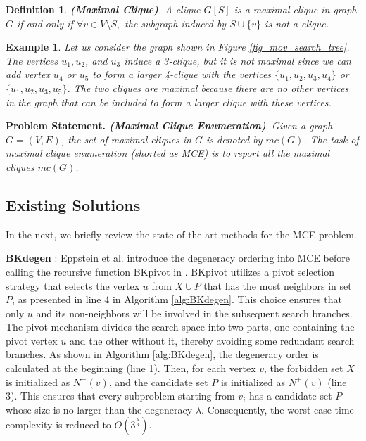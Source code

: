 \documentclass[sigconf, nonacm]{acmart}
\newtheorem{definition}{Definition}%
\newtheorem{exmp}{Example}%
\begin{document}
\begin{definition}
\textit{{\textbf{(Maximal Clique)}}.
A clique $G[S]$ is a maximal clique in graph $G$ if and only if $\forall v \in V\setminus S,$ the subgraph induced by $S\cup \{v\}$ is not a clique.
}
\end{definition}

\begin{exmp}
    \textit{
    Let us consider the graph shown in Figure \ref{fig_mov_search_tree}. The vertices $u_1, u_2$, and $u_3$ induce a 3-clique, but it is not maximal since we can add vertex $u_4$ or $u_5$ to form a larger 4-clique with the vertices $\{u_1, u_2, u_3,u_4\}$ or 
 $\{u_1, u_2, u_3,u_5\}$. The two cliques are maximal because there are no other vertices in the graph that can be included to form a larger clique with these vertices.
    }
\end{exmp}

\noindent \textbf{Problem Statement.  \textit{(Maximal Clique Enumeration)}}. \textit{Given a graph $G=(V,E)$, the set of maximal cliques in $G$ is denoted by $mc(G)$. The task of maximal clique enumeration (shorted as MCE) is to report all the maximal cliques $mc(G)$. 
}

\subsection{Existing Solutions}\label{subsec:existing solutions}

In the next, we %
briefly review the state-of-the-art methods for the MCE problem.




\noindent\textbf{BKdegen} \cite{eppstein2010listing}: Eppstein et al. introduce the degeneracy ordering into MCE before calling the recursive function BKpivot in \cite{tomita2006worst}.
BKpivot utilizes a pivot selection strategy that selects the vertex $u$ from $X \cup P$ that has the most neighbors in set $P$, as presented in line 4 in Algorithm \ref{alg:BKdegen}.  This choice ensures that only $u$ and its non-neighbors will be involved in the subsequent search branches. The pivot mechanism divides the search space into two parts, one containing the pivot vertex $u$ and the other without it, thereby avoiding some redundant search branches.
As shown in Algorithm \ref{alg:BKdegen}, the degeneracy order is calculated at the beginning (line 1). Then, for each vertex $v$, the forbidden set $X$ is initialized as $N^-(v)$, and the candidate set $P$ is initialized as $N^+(v)$ (line 3). This ensures that every subproblem starting from $v_i$ has a candidate set $P$ whose size is no larger than the degeneracy $\lambda$. Consequently, the worst-case time complexity is reduced to $O(3^{\frac{\lambda}{3}})$.
\end{document}
